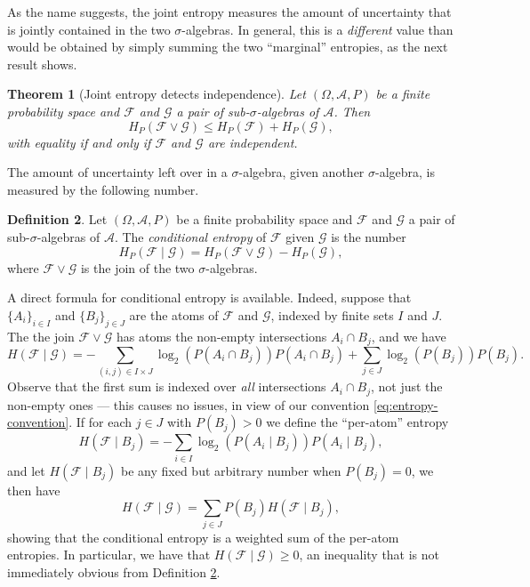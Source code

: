 \documentclass[11pt]{book}
\newtheorem{thm}{Theorem}[section]
\theoremstyle{definition}
\newtheorem{defn}[thm]{Definition}
\numberwithin{equation}{section}
\begin{document}
As the name suggests, the joint entropy measures the amount of uncertainty that is jointly contained in the two $\sigma$-algebras. In general, this is a \textit{different} value than would be obtained by simply summing the two ``marginal'' entropies, as the next result shows.

\begin{thm}[Joint entropy detects independence]\label{thm:joint-entropy-ineq}
	Let $(\Omega,\mathcal{A},P)$ be a finite probability space and $\mathcal{F}$ and $\mathcal{G}$ a pair of sub-$\sigma$-algebras of $\mathcal{A}$. Then
	\[
		H_P(\mathcal{F} \vee \mathcal{G}) \leq H_P(\mathcal{F}) + H_P(\mathcal{G}),
	\]
	with equality if and only if $\mathcal{F}$ and $\mathcal{G}$ are independent.
\end{thm}

The amount of uncertainty left over in a $\sigma$-algebra, given another $\sigma$-algebra, is measured by the following number.

\begin{defn}\label{defn:conditional-entropy}
	Let $(\Omega,\mathcal{A},P)$ be a finite probability space and $\mathcal{F}$ and $\mathcal{G}$ a pair of sub-$\sigma$-algebras of $\mathcal{A}$. The \textit{conditional entropy} of $\mathcal{F}$ given $\mathcal{G}$ is the number
	\[
		H_P(\mathcal{F} \mid \mathcal{G}) = H_P(\mathcal{F} \vee \mathcal{G}) - H_P(\mathcal{G}),
	\]
	where $\mathcal{F}\vee \mathcal{G}$ is the join of the two $\sigma$-algebras.
\end{defn}

A direct formula for conditional entropy is available. Indeed, suppose that $\{A_i\}_{i\in I}$ and $\{B_j\}_{j\in J}$ are the atoms of $\mathcal{F}$ and $\mathcal{G}$, indexed by finite sets $I$ and $J$. The the join $\mathcal{F} \vee \mathcal{G}$ has atoms the non-empty intersections $A_i \cap B_j$, and we have
\[
	H(\mathcal{F} \mid \mathcal{G}) = -\sum_{(i,j) \in I \times J} \log_2{\left( P(A_i \cap B_j) \right)} P(A_i \cap B_j)  + \sum_{j\in J} \log_2{\left( P(B_j) \right)} P(B_j).
\]
Observe that the first sum is indexed over \textit{all} intersections $A_i \cap B_j$, not just the non-empty ones — this causes no issues, in view of our convention \eqref{eq:entropy-convention}. If for each $j\in J$ with $P(B_j) > 0$ we define the ``per-atom'' entropy
\[
	H(\mathcal{F} \mid B_j) = - \sum_{i\in I} \log_2{\left( P(A_i \mid B_j) \right)} P(A_i \mid B_j),
\]
and let $H(\mathcal{F} \mid B_j)$ be any fixed but arbitrary number when $P(B_j) =0$, we then have
\[
	H(\mathcal{F} \mid \mathcal{G}) = \sum_{j\in J} P(B_j) H(\mathcal{F} \mid B_j),
\]
showing that the conditional entropy is a weighted sum of the per-atom entropies. In particular, we have that $H(\mathcal{F} \mid \mathcal{G})\geq 0$, an inequality that is not immediately obvious from Definition \ref{defn:conditional-entropy}.
\end{document}
